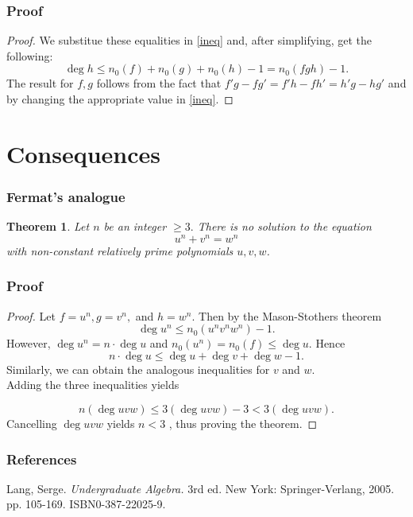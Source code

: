 \documentclass[envcountsect]{beamer}
\newtheorem*{theorem*}{Theorem}
\begin{document}
\begin{frame}
  \frametitle{Proof}
  \begin{proof}
We substitue these equalities in \eqref{ineq} and, after simplifying, get the
following:
\[
 \operatorname{deg}h \leq n_0(f) + n_0(g) + n_0(h) - 1 = n_0(fgh) - 1.
\]
The result for $f,g$ follows from the fact that $f'g - fg' = f'h - fh' =
h'g-hg'$ and by changing the appropriate value in \eqref{ineq}.

  \end{proof}
\end{frame}

\section{Consequences}
\begin{frame}
\frametitle{Fermat's analogue} 
\begin{theorem*}
Let $n$ be an integer $\geq 3.$ There is no solution to the equation \[u^n +
  v^n = w^n\] with non-constant relatively prime polynomials $u,v,w$. 
\end{theorem*}



\end{frame}

\begin{frame}
  \frametitle{Proof}

  \begin{proof}
    \small
    Let $f =u^n, g = v^n,$ and $h=w^n.$ Then by the Mason-Stothers theorem
    \[
      \operatorname{deg}u^n \leq n_0(u^nv^nw^n) - 1.
    \]
    However, $\operatorname{deg}u^n=n \cdot \operatorname{deg}u$ and $n_0(u^n) =
    n_0(f) \leq \operatorname{deg}u.$ Hence 
\[
  n \cdot \operatorname{deg}u \leq \operatorname{deg}u + \operatorname{deg}v +
  \operatorname{deg}w - 1.
\]
   Similarly, we can obtain the analogous inequalities for $v$ and $w.$ \\
Adding the three inequalities yields

\[
  n(\operatorname{deg}uvw) \leq 3(\operatorname{deg}uvw) -3 < 3(\operatorname{deg}uvw).
\]
Cancelling $\operatorname{deg}uvw$ yields $ n < 3$ , thus proving the theorem.
\end{proof}
\end{frame}

\begin{frame}
  \frametitle{References}
  Lang, Serge. \textit{Undergraduate Algebra.} 3rd ed. New York:
  Springer-Verlang, 2005. pp. 105-169. ISBN0-387-22025-9.
\end{frame}  
\end{document}
